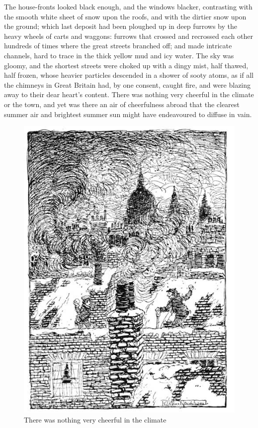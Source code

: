 \documentclass[paper=5.5in:8.5in,BCOR=15mm,twoside,DIV=15,headinclude=off,12pt,chapterprefix=off,openany,headings=huge]{scrbook} %
\begin{document}
The house-fronts looked black enough, and the windows blacker, contrasting with the smooth white sheet of snow upon the roofs, and with the dirtier snow upon the ground; which last deposit had been ploughed up in deep furrows by the heavy wheels of carts and waggons: furrows that crossed and recrossed each other hundreds of times where the great streets branched off; and made intricate channels, hard to trace in the thick yellow mud and icy water. The sky was gloomy, and the shortest streets were choked up with a dingy mist, half thawed, half frozen, whose heavier particles descended in a shower of sooty atoms, as if all the chimneys in Great Britain had, by one consent, caught fire, and were blazing away to their dear heart's content. There was nothing very cheerful in the climate or the town, and yet was there an air of cheerfulness abroad that the clearest summer air and brightest summer sun might have endeavoured to diffuse in vain.

\begin{figure}
\begin{minipage}[c]{\linewidth}
\includegraphics[width=\linewidth]{gs100}
\caption*{There was nothing very cheerful in the climate}
\end{minipage}
\end{figure}
\end{document}
